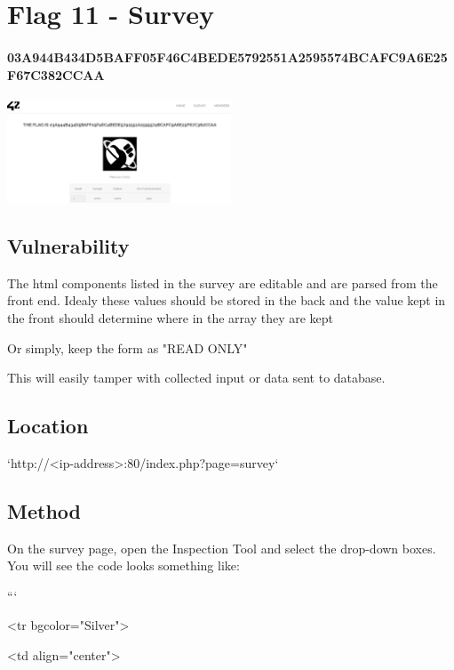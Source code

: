 \section{Flag 11 - Survey}

\paragraph{03A944B434D5BAFF05F46C4BEDE5792551A2595574BCAFC9A6E25F67C382CCAA}
\begin{center}
    \includegraphics[width=0.5\textwidth]{14.Flag11/11-05.png}\\[0cm] 
\end{center}

\subsection{Vulnerability}

The html components listed in the survey are editable and are parsed from the front end. Idealy these values should be stored in the back and the value kept in the front should determine where in the array they are kept

Or simply, keep the form as "READ ONLY"

This will easily tamper with collected input or data sent to database.

\subsection{Location}

`http://<ip-address>:80/index.php?page=survey`

\subsection{Method}

On the survey page, open the Inspection Tool and select the drop-down boxes. You will see the code looks something like:

```

<tr bgcolor="Silver">

    <td align="center">
    
